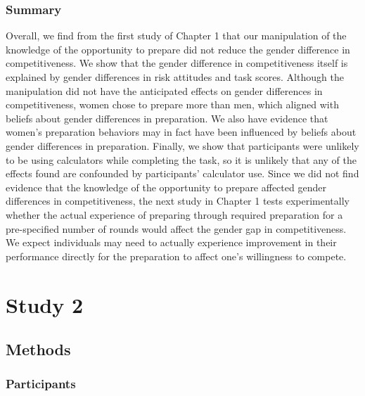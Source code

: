 \documentclass[letterpaper, nobind]{templates/ociamthesis}
\begin{document}
\hypertarget{summary}{%
\subsubsection{Summary}\label{summary}}

Overall, we find from the first study of Chapter 1 that our manipulation of the knowledge of the opportunity to prepare did not reduce the gender difference in competitiveness. We show that the gender difference in competitiveness itself is explained by gender differences in risk attitudes and task scores. Although the manipulation did not have the anticipated effects on gender differences in competitiveness, women chose to prepare more than men, which aligned with beliefs about gender differences in preparation. We also have evidence that women's preparation behaviors may in fact have been influenced by beliefs about gender differences in preparation. Finally, we show that participants were unlikely to be using calculators while completing the task, so it is unlikely that any of the effects found are confounded by participants' calculator use. Since we did not find evidence that the knowledge of the opportunity to prepare affected gender differences in competitiveness, the next study in Chapter 1 tests experimentally whether the actual experience of preparing through required preparation for a pre-specified number of rounds would affect the gender gap in competitiveness. We expect individuals may need to actually experience improvement in their performance directly for the preparation to affect one's willingness to compete.

\newpage

\hypertarget{study-2}{%
\section{Study 2}\label{study-2}}

\hypertarget{methods-1}{%
\subsection{Methods}\label{methods-1}}

\hypertarget{participants-1}{%
\subsubsection{Participants}\label{participants-1}}
\end{document}
